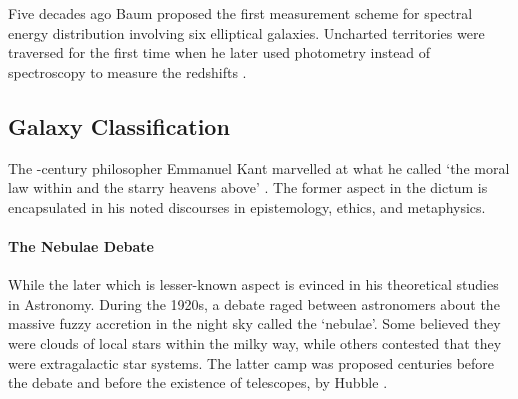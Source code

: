 Five decades ago Baum proposed the first measurement scheme for spectral energy distribution involving six elliptical galaxies. Uncharted territories were traversed for the first time when he later used photometry instead of spectroscopy to measure the redshifts \parencite[325]{way_advances_2012}.

\subsection{Galaxy Classification}
The -century philosopher Emmanuel Kant marvelled at what he called `the moral law within and the starry heavens above' \parencite[1]{kant_kant:_2012}. The former aspect in the dictum is encapsulated in his noted discourses in epistemology, ethics, and metaphysics.

\paragraph{The Nebulae Debate}
While the later which is lesser-known aspect is evinced in his theoretical studies in Astronomy. During the 1920s, a debate raged between astronomers about the massive fuzzy accretion in the night sky called the `nebulae'. Some believed they were clouds of local stars within the milky way, while others contested that they were extragalactic star systems. The latter camp was proposed centuries before the debate and before the existence of telescopes, by Hubble \parencite{hubble_realm_2013}.

